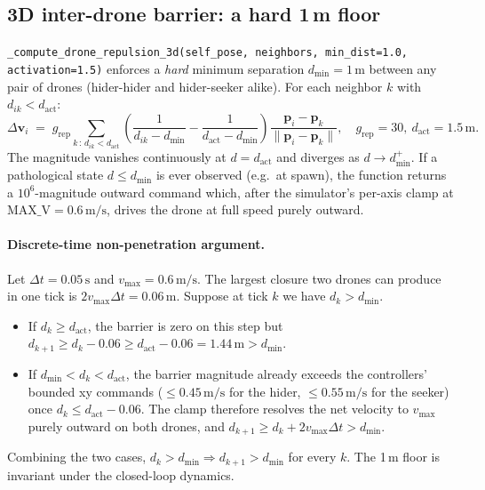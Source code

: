 \documentclass[11pt,a4paper]{article}
\newcommand{\code}[1]{\texttt{#1}}
\newcommand{\vect}[1]{\mathbf{#1}}
\begin{document}
\subsection{3D inter-drone barrier: a hard 1\,m floor}

\code{\_compute\_drone\_repulsion\_3d(self\_pose, neighbors,
min\_dist=1.0, activation=1.5)} enforces a \emph{hard} minimum separation
$d_\mathrm{min} = 1\,\text{m}$ between any pair of drones (hider-hider and
hider-seeker alike). For each neighbor $k$ with $d_{ik} < d_\mathrm{act}$:
\[
    \Delta\vect{v}_i \;=\; g_\mathrm{rep}
    \sum_{k\,:\,d_{ik} < d_\mathrm{act}}
    \!\left(\frac{1}{d_{ik} - d_\mathrm{min}} - \frac{1}{d_\mathrm{act} - d_\mathrm{min}}\right)
    \frac{\vect{p}_i - \vect{p}_k}{\|\vect{p}_i - \vect{p}_k\|},
    \quad g_\mathrm{rep} = 30,\ d_\mathrm{act} = 1.5\,\text{m}.
\]
The magnitude vanishes continuously at $d = d_\mathrm{act}$ and diverges as
$d \to d_\mathrm{min}^+$. If a pathological state $d \le d_\mathrm{min}$ is
ever observed (e.g.\ at spawn), the function returns a $10^6$-magnitude
outward command which, after the simulator's per-axis clamp at
$\text{MAX\_V} = 0.6\,\text{m/s}$, drives the drone at full speed purely
outward.

\paragraph{Discrete-time non-penetration argument.}
Let $\Delta t = 0.05\,\text{s}$ and $v_\mathrm{max} = 0.6\,\text{m/s}$.
The largest closure two drones can produce in one tick is
$2 v_\mathrm{max} \Delta t = 0.06\,\text{m}$. Suppose at tick $k$ we have
$d_k > d_\mathrm{min}$.
\begin{itemize}[leftmargin=1.4em]
  \item If $d_k \ge d_\mathrm{act}$, the barrier is zero on this step but
        $d_{k+1} \ge d_k - 0.06 \ge d_\mathrm{act} - 0.06 = 1.44\,\text{m}
        > d_\mathrm{min}$.
  \item If $d_\mathrm{min} < d_k < d_\mathrm{act}$, the barrier magnitude
        already exceeds the controllers' bounded xy commands ($\le
        0.45\,\text{m/s}$ for the hider, $\le 0.55\,\text{m/s}$ for the
        seeker) once $d_k \le d_\mathrm{act} - 0.06$. The clamp therefore
        resolves the net velocity to $v_\mathrm{max}$ purely outward on
        both drones, and
        $d_{k+1} \ge d_k + 2 v_\mathrm{max} \Delta t > d_\mathrm{min}$.
\end{itemize}
Combining the two cases, $d_k > d_\mathrm{min} \Rightarrow d_{k+1} >
d_\mathrm{min}$ for every $k$. The 1\,m floor is invariant under the
closed-loop dynamics.
\end{document}
